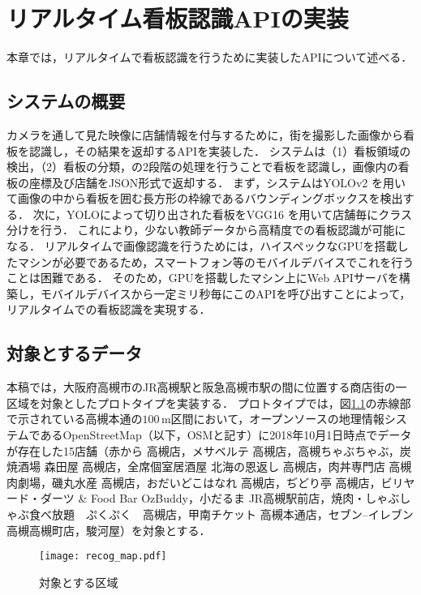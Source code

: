 \chapter{リアルタイム看板認識APIの実装}
\label{chapter:implement_recog}
本章では，リアルタイムで看板認識を行うために実装したAPIについて述べる．

\section{システムの概要}
  カメラを通して見た映像に店舗情報を付与するために，街を撮影した画像から看板を認識し，その結果を返却するAPIを実装した\cite{Kitamura:2018}．
  システムは（1）看板領域の検出，（2）看板の分類，の2段階の処理を行うことで看板を認識し，画像内の看板の座標及び店舗をJSON形式で返却する．
  まず，システムはYOLOv2 \cite{Redmon:2017}を用いて画像の中から看板を囲む長方形の枠線であるバウンディングボックスを検出する．
  次に，YOLOによって切り出された看板をVGG16 \cite{Simonyan:2015}を用いて店舗毎にクラス分けを行う．
  これにより，少ない教師データから高精度での看板認識が可能になる．
  リアルタイムで画像認識を行うためには，ハイスペックなGPUを搭載したマシンが必要であるため，スマートフォン等のモバイルデバイスでこれを行うことは困難である．
  そのため，GPUを搭載したマシン上にWeb APIサーバを構築し，モバイルデバイスから一定ミリ秒毎にこのAPIを呼び出すことによって，リアルタイムでの看板認識を実現する．
  
\section{対象とするデータ}
\label{section:target_data}
  本稿では，大阪府高槻市のJR高槻駅と阪急高槻市駅の間に位置する商店街の一区域を対象としたプロトタイプを実装する．
  プロトタイプでは，図\ref{figure:recog_map}の赤線部で示されている高槻本通の$100\, \mathrm{m}$区間において，オープンソースの地理情報システムであるOpenStreetMap（以下，OSMと記す）\cite{Haklay:2008}に2018年10月1日時点でデータが存在した15店舗（赤から 高槻店，メサベルテ 高槻店，高槻ちゃぶちゃぶ，炭焼酒場 森田屋 高槻店，全席個室居酒屋 北海の恩返し 高槻店，肉丼専門店 高槻肉劇場，磯丸水産 高槻店，おだいどこはなれ 高槻店，ぢどり亭 高槻店，ビリヤード・ダーツ \& Food Bar OzBuddy，小だるま JR高槻駅前店，焼肉・しゃぶしゃぶ食べ放題　ぷくぷく　高槻店，甲南チケット 高槻本通店，セブン--イレブン 高槻高槻町店，駿河屋）を対象とする．
  \begin{figure}[tb]
    \centerline{\texttt{[image: recog\_map.pdf]}}
    \caption{対象とする区域}
    \label{figure:recog_map}
  \end{figure}

